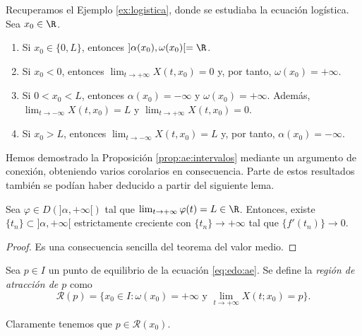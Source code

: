 \documentclass{article}
\begin{document}
\begin{ex} \label{ex:logistica:2} Recuperamos el Ejemplo \ref{ex:logistica},
  donde se estudiaba la ecuación logística. Sea $x_0 \in \R$.
  \begin{enumerate}
  \item Si $x_0 \in \{0, L\}$, entonces $]\alpha(x_0), \omega(x_0)[ = \R$.
  \item Si $x_0 < 0$, entonces $\lim_{t \to +\infty} X(t,x_0) = 0$ y, por tanto,
    $\omega(x_0) = +\infty$.
  \item Si $0 < x_0 < L$, entonces $\alpha(x_0) = -\infty$ y $\omega(x_0) = +\infty$. Además,
    $\lim_{t \to -\infty} X(t,x_0) = L$ y $\lim_{t \to +\infty} X(t,x_0) = 0$.
  \item Si $x_0 > L$, entonces $\lim_{t \to -\infty} X(t,x_0) = L$ y, por tanto,
    $\alpha(x_0) = -\infty$. \qedhere
  \end{enumerate}
\end{ex}

Hemos demostrado la Proposición \ref{prop:ae:intervalos} mediante un argumento de conexión,
obteniendo varios corolarios en consecuencia. Parte de estos resultados también se podían haber
deducido a partir del siguiente lema.

\begin{lemma}
  \label{lem:barbalet}
  Sea $\varphi \in D(]\alpha, +\infty[)$ tal que $\lim_{t \to +\infty} \varphi(t) = L \in
  \R$. Entonces, existe $\{t_n\} \subset ]\alpha, +\infty[$ estrictamente creciente con
  $\{t_n\} \to +\infty$ tal que $\{f'(t_n)\} \to 0$.
\end{lemma}
\begin{proof}
  Es una consecuencia sencilla del teorema del valor medio.
\end{proof}

\begin{definition}
  \label{def:ra}
  Sea $p \in I$ un punto de equilibrio de la ecuación \eqref{eq:edo:ae}. Se define la \emph{región
    de atracción de $p$} como
  \[ \mathcal{R}(p) = \{x_0\in I: \omega(x_0) = +\infty \text{ y } \lim_{t \to +\infty} X(t;x_0) =
    p\}. \]
\end{definition}

Claramente tenemos que $p \in \mathcal{R}(x_0)$.
\end{document}
